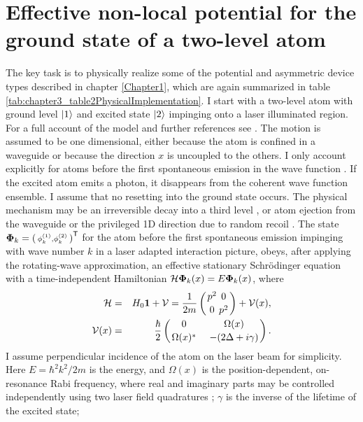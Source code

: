 \section{Effective non-local potential for the ground state of a two-level atom\label{sec:chapter3_enl}}
%
The key task is to physically realize some of the potential and asymmetric device types described in chapter \ref{Chapter1}, which are again summarized in table \ref{tab:chapter3_table2PhysicalImplementation}. I start with a two-level atom with ground level $\ket{1}$ and excited state $\ket{2}$ impinging onto a laser illuminated region. For a full account of the model and further references see
\cite{Ruschhaupt2009}. The motion is assumed to be one dimensional, either because the atom is confined in a waveguide or because the direction $x$ is uncoupled to
the others.
I only account explicitly for atoms before the first spontaneous emission in the wave function
\cite{Hegerfeldt1996,Damborenea2002,Navarro2003}.
If the excited atom emits a photon, it disappears from the coherent wave function ensemble.
I assume that no resetting into the ground state occurs. The physical mechanism
may be an irreversible decay into a third level  \cite{Oberthaler1996}, or atom ejection from the waveguide or the privileged 1D direction due to  random recoil  \cite{Streed2006}.
The state ${\bf\Phi}_k=\left(\begin{smallmatrix}\phi_k^{(1)},\phi_k^{(2)}\end{smallmatrix}\right)^{\sf T}$
for the atom before the first spontaneous emission impinging with wave number $k$
in a laser adapted  interaction picture,
obeys, after applying the rotating-wave approximation, an effective stationary Schr\"{o}dinger equation
with a time-independent Hamiltonian \cite{Ruschhaupt2004a,Ruschhaupt2009}
%
${\cal H}{\bf\Phi}_k(x)=E{\bf\Phi}_k(x)$,
%
where
%
\begin{eqnarray}
  {\cal H}&=& H_0{\bf 1}+ {\cal V}=\frac{1}{2m}\left(
  {{p}^2\atop 0}{0\atop {p}^2}\right)+ {\cal V}(x),
  \\
  {\cal V}(x) &=&
  \frac{\hbar}{2}\left(
  {0\atop \Omega(x)^*}\;\;\;\;
  {\Omega(x)\atop -(2\Delta+i\gamma)}
  \right).
\end{eqnarray}
%
I assume perpendicular incidence of the atom on the laser beam for simplicity. Here $E=\hbar^2 k^2/2m$ is the energy, and
$\Omega(x)$ is the position-dependent, on-resonance Rabi frequency, where real and imaginary parts may be controlled independently
using two  laser field quadratures  \cite{Zhang2013};
$\gamma$ is the inverse of the lifetime of the excited state;
